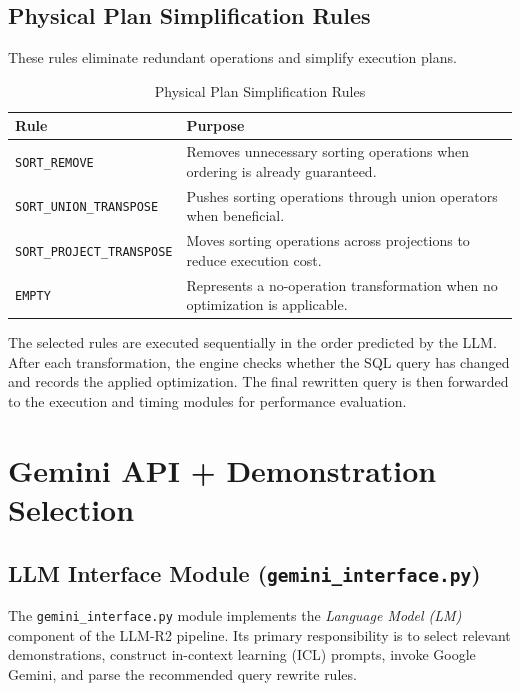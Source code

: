 \documentclass[12pt,a4paper]{article}
\begin{document}
\subsection{Physical Plan Simplification Rules}

These rules eliminate redundant operations and simplify execution plans.

\begin{table}[h]
\centering
\caption{Physical Plan Simplification Rules}
\begin{tabular}{|l|p{8cm}|}
\hline
\textbf{Rule} & \textbf{Purpose} \\
\hline
\texttt{SORT\_REMOVE} &
Removes unnecessary sorting operations when ordering is already guaranteed. \\
\hline

\texttt{SORT\_UNION\_TRANSPOSE} &
Pushes sorting operations through union operators when beneficial. \\
\hline

\texttt{SORT\_PROJECT\_TRANSPOSE} &
Moves sorting operations across projections to reduce execution cost. \\
\hline

\texttt{EMPTY} &
Represents a no-operation transformation when no optimization is applicable. \\
\hline
\end{tabular}
\end{table}

The selected rules are executed sequentially in the order predicted by the LLM. After each transformation, the engine checks whether the SQL query has changed and records the applied optimization. The final rewritten query is then forwarded to the execution and timing modules for performance evaluation.

\newpage

\section{Gemini API + Demonstration Selection}

\subsection{LLM Interface Module (\texttt{gemini\_interface.py})}

The \texttt{gemini\_interface.py} module implements the \emph{Language Model (LM)} component of the LLM-R2 pipeline. Its primary responsibility is to select relevant demonstrations, construct in-context learning (ICL) prompts, invoke Google Gemini, and parse the recommended query rewrite rules.
\end{document}
